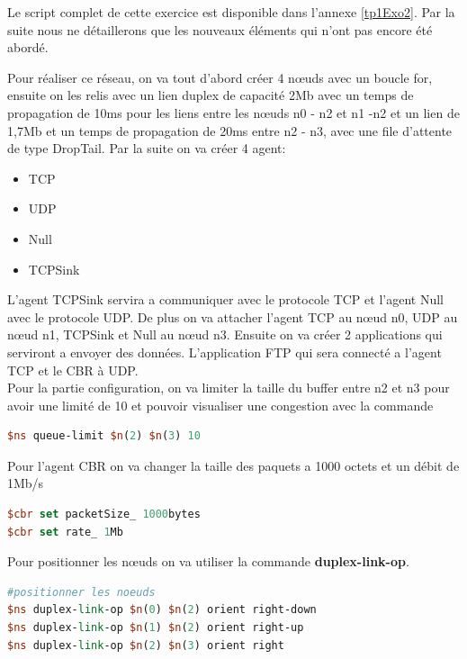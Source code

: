 \documentclass[11pt]{article}
\begin{document}
Le script complet de cette exercice est disponible dans l'annexe \ref{tp1Exo2}. Par la suite nous ne détaillerons que les nouveaux éléments qui n'ont pas encore été abordé.

Pour réaliser ce réseau, on va tout d'abord créer 4 nœuds avec un boucle for, ensuite on les relis avec un lien duplex de capacité 2Mb avec un temps de propagation de 10ms pour les liens entre les nœuds n0 - n2 et n1 -n2 et un lien de 1,7Mb et un temps de propagation de 20ms entre n2 - n3, avec une file d'attente de type DropTail.
Par la suite on va créer 4 agent: 
\begin{itemize}
	\item TCP
	\item UDP
	\item Null
	\item TCPSink
\end{itemize}
L'agent TCPSink servira a communiquer avec le protocole TCP et l'agent Null avec le protocole UDP. De plus on va attacher l'agent TCP au nœud n0, UDP au nœud n1, TCPSink et Null au nœud n3. Ensuite on va créer 2 applications qui serviront a envoyer des données. L'application FTP qui sera connecté a l'agent TCP et le CBR à UDP.\\

Pour la partie configuration, on va limiter la taille du buffer entre n2 et n3 pour avoir une limité de 10 et pouvoir visualiser une congestion  avec la commande 
\begin{lstlisting}[language=tcl, numbers=none, framexleftmargin=0pt, 	framextopmargin=0pt, framexbottommargin=0pt]
$ns queue-limit $n(2) $n(3) 10
\end{lstlisting}

Pour l'agent CBR on va changer la taille des paquets a 1000 octets et un débit de 1Mb/s
\begin{lstlisting}[language=tcl, numbers=none, framexleftmargin=0pt, 	framextopmargin=0pt, framexbottommargin=0pt]
$cbr set packetSize_ 1000bytes
$cbr set rate_ 1Mb
\end{lstlisting}

Pour positionner les nœuds on va utiliser la commande \textbf{duplex-link-op}.
\begin{lstlisting}[language=tcl, numbers=none, framexleftmargin=0pt, 	framextopmargin=0pt, framexbottommargin=0pt]
#positionner les noeuds
$ns duplex-link-op $n(0) $n(2) orient right-down
$ns duplex-link-op $n(1) $n(2) orient right-up
$ns duplex-link-op $n(2) $n(3) orient right
\end{lstlisting}
\end{document}
